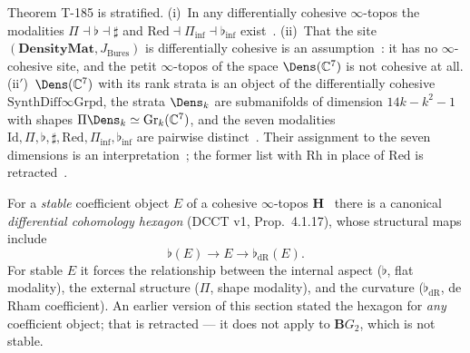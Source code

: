 Theorem T-185 is stratified. (i)~In any differentially cohesive $\infty$-topos the
modalities $\Pi \dashv \flat \dashv \sharp$ and $\mathrm{Red} \dashv \Pi_{\inf} \dashv
\flat_{\inf}$ exist~. (ii)~That the site $(\mathbf{DensityMat}, J_{\mathrm{Bures}})$
is differentially cohesive is an assumption~: it has no $\infty$-cohesive site,
and the petit $\infty$-topos of the space $\Dens(\mathbb{C}^7)$ is not cohesive at all.
(ii$'$)~$\Dens(\mathbb{C}^7)$ with its rank strata is an object of the differentially
cohesive $\mathrm{SynthDiff}\infty\mathrm{Grpd}$, the strata $\Dens_k$ are submanifolds of
dimension $14k - k^2 - 1$ with shapes $\Pi\Dens_k \simeq \mathrm{Gr}_k(\mathbb{C}^7)$, and
the seven modalities $\mathrm{Id}, \Pi, \flat, \sharp, \mathrm{Red}, \Pi_{\inf}, \flat_{\inf}$
are pairwise distinct~. Their assignment to the seven dimensions is an
interpretation~; the former list with $\mathrm{Rh}$ in place of $\mathrm{Red}$ is
retracted~\status{$\times$}.

For a \emph{stable} coefficient object $E$ of a cohesive $\infty$-topos
$\mathbf{H}$~\cite{schreiber2013} there is a canonical \emph{differential cohomology
hexagon} (DCCT v1, Prop.~4.1.17), whose structural maps include
\begin{equation}
  \flat(E) \to E \to \flat_{\mathrm{dR}}(E).
  \label{eq:hexagon}
\end{equation}
For stable $E$ it forces the relationship between the internal aspect ($\flat$, flat
modality), the external structure ($\Pi$, shape modality), and the curvature
($\flat_{\mathrm{dR}}$, de Rham coefficient). An earlier version of this section stated the
hexagon for \emph{any} coefficient object; that is retracted --- it does not apply to
$\mathbf{B}G_2$, which is not stable.

